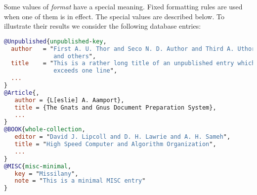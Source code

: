 \documentclass[11pt,a4paper]{scrbook}
\begin{document}
Some values of \textit{format} have a special meaning. Fixed formatting rules
are used when one of them is in effect. The special values are described
below. To illustrate their results we consider the following \BibTeX{}
database entries:
\begin{lstlisting}[language=BibTeX]
@Unpublished{unpublished-key,
  author   = "First A. U. Thor and Seco N. D. Author and Third A. Uthor
              and others",
  title    = "This is a rather long title of an unpublished entry which
              exceeds one line",
  ...
}
@Article{,
   author = {L[eslie] A. Aamport},
   title = {The Gnats and Gnus Document Preparation System},
   ...
}
@BOOK{whole-collection,
   editor = "David J. Lipcoll and D. H. Lawrie and A. H. Sameh",
   title = "High Speed Computer and Algorithm Organization",
   ...
}
@MISC{misc-minimal,
   key = "Missilany",
   note = "This is a minimal MISC entry"
}
\end{lstlisting}
\end{document}
